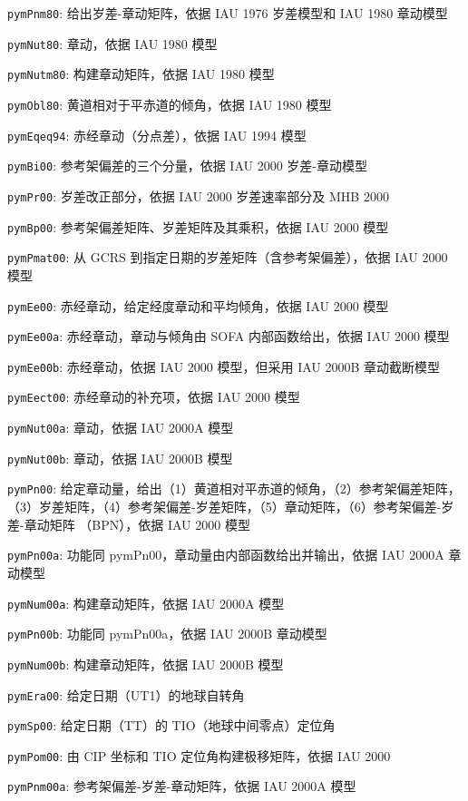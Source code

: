 \documentclass[11pt]{article}
\begin{document}
\texttt{pymPnm80}: 给出岁差-章动矩阵，依据 IAU 1976 岁差模型和 IAU 1980 章动模型

\texttt{pymNut80}: 章动，依据 IAU 1980 模型

\texttt{pymNutm80}: 构建章动矩阵，依据 IAU 1980 模型

\texttt{pymObl80}: 黄道相对于平赤道的倾角，依据 IAU 1980 模型

\texttt{pymEqeq94}: 赤经章动（分点差），依据 IAU 1994 模型

\texttt{pymBi00}: 参考架偏差的三个分量，依据 IAU 2000 岁差-章动模型

\texttt{pymPr00}: 岁差改正部分，依据 IAU 2000 岁差速率部分及 MHB 2000

\texttt{pymBp00}: 参考架偏差矩阵、岁差矩阵及其乘积，依据 IAU 2000 模型

\texttt{pymPmat00}: 从 GCRS 到指定日期的岁差矩阵（含参考架偏差），依据 IAU 2000 模型

\texttt{pymEe00}: 赤经章动，给定经度章动和平均倾角，依据 IAU 2000 模型

\texttt{pymEe00a}: 赤经章动，章动与倾角由 SOFA 内部函数给出，依据 IAU 2000 模型

\texttt{pymEe00b}: 赤经章动，依据 IAU 2000 模型，但采用 IAU 2000B 章动截断模型

\texttt{pymEect00}: 赤经章动的补充项，依据 IAU 2000 模型

\texttt{pymNut00a}: 章动，依据 IAU 2000A 模型

\texttt{pymNut00b}: 章动，依据 IAU 2000B 模型

\texttt{pymPn00}: 给定章动量，给出（1）黄道相对平赤道的倾角，（2）参考架偏差矩阵，
（3）岁差矩阵，（4）参考架偏差-岁差矩阵，（5）章动矩阵，（6）参考架偏差-岁差-章动矩阵
（BPN），依据 IAU 2000 模型

\texttt{pymPn00a}: 功能同 pymPn00，章动量由内部函数给出并输出，依据 IAU 2000A 章动模型

\texttt{pymNum00a}: 构建章动矩阵，依据 IAU 2000A 模型

\texttt{pymPn00b}: 功能同 pymPn00a，依据 IAU 2000B 章动模型

\texttt{pymNum00b}: 构建章动矩阵，依据 IAU 2000B 模型

\texttt{pymEra00}: 给定日期（UT1）的地球自转角

\texttt{pymSp00}: 给定日期（TT）的 TIO（地球中间零点）定位角

\texttt{pymPom00}: 由 CIP 坐标和 TIO 定位角构建极移矩阵，依据 IAU 2000

\texttt{pymPnm00a}: 参考架偏差-岁差-章动矩阵，依据 IAU 2000A 模型
\end{document}
